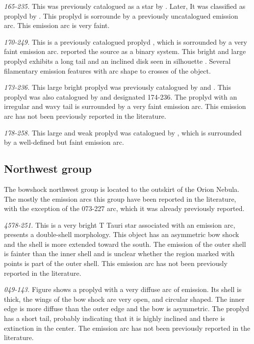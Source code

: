 \documentclass{article}
\begin{document}
\textit{165-235.} This was previously catalogued as a star by \citet{Odell:1996}. Later, It was classified as proplyd by \citet{Ricci:2008}. This proplyd is sorrounde by a previously uncatalogued emission arc. This emission arc is very faint.

\textit{170-249.} This is a previously catalogued proplyd \citet{Odell:1996, Ricci:2008}, which is sorrounded by a very faint emission arc. \citet{Ricci:2008} reported the source as a binary system.  This bright and large proplyd exhibits a long tail and an inclined disk seen in silhouette \citep{Bally:2000a}. Several  filamentary emission features with arc shape to crosses of the object. 

\textit{173-236.} This large bright proplyd was previously catalogued by \citet{Odell:1996} and \citet{Ricci:2008}. This proplyd was also catalogued by \citet{Bally:2000a} and designated 174-236. The proplyd with an irregular and wavy tail \citep[see][]{Bally:2000a} is surrounded by a very faint  emission arc. This emission arc has not been previously reported in the literature.   

\textit{178-258.}  This large and weak proplyd was catalogued by \citet{Ricci:2008}, which is surrounded by a well-defined but faint emission arc.

\subsection{Northwest group}
\label{sec:NW}

The bowshock northwest group is located to the outskirt of the Orion Nebula. The mostly the emission arcs this group have been reported in the literature, with the exception of the  073-227 arc, which it was already previously reported.    

\textit{4578-251.} This  is a very bright T Tauri star associated with an emission arc, presents a double-shell morphology. This object has an asymmetric bow shock and the shell is more extended toward the south. The emission of the outer shell is fainter than the inner shell and is unclear whether the region marked with points is part of the outer shell. This emission arc has not been previously reported in the literature. 

\textit{049-143.} Figure shows a proplyd with a very diffuse arc of emission. Its shell is thick, the wings of the bow shock are very open, and circular shaped. The inner edge is more diffuse than the outer edge and the bow is asymmetric. The  proplyd has a short tail, probably indicating that it is highly inclined and there is extinction in the center. The emission arc has not been previously reported in the literature.  
 
\end{document}
